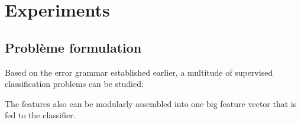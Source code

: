 \documentclass[../main.tex]{subfile}
\begin{document}
    \section{Experiments}
    
    \subsection{Problème formulation}

    Based on the error grammar established earlier, a multitude of supervised classification problems can be studied:

	\begin{figure}
		\begin{center}
			
			\caption{\label{fig::classif_prb}}
		\end{center}
	\end{figure}

    The features also can be modularly assembled into one big feature vector that is fed to the classifier.
\end{document}
